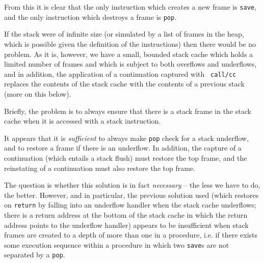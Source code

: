 From this it is clear that the only instruction which creates a new frame
is {\tt save}, and the only instruction which destroys a frame is {\tt pop}.

If the stack were of infinite size (or simulated by a list of frames
in the heap, which is possible given the definition of the
instructions) then there would be no problem. As it is, however, we
have a small, bounded stack cache which holds a limited number of
frames and which is subject to both overflows and underflows, and in
addition, the application of a continuation captured with {\tt
call/cc} replaces the contents of the stack cache with the contents of
a previous stack (more on this below).

Briefly, the problem is to always ensure that there is a stack frame in
the stack cache when it is accessed with a stack instruction. 

It appears that it is {\em sufficient} to always make {\tt pop} check for a
stack underflow, and to restore a frame if there is an underflow. In
addition, the capture of a continuation (which entails a stack flush)
must restore the top frame, and the reinstating of a continuation must
also restore the top frame. 

The question is whether this solution is in fact {\em necessary} --
the less we have to do, the better. However, and in particular, the
previous solution used (which restores on {\tt return} by falling into
an underflow handler when the stack cache underflows; there is a
return address at the bottom of the stack cache in which the return
address points to the underflow handler) appears to be insufficient
when stack frames are created to a depth of more than one in a
procedure, i.e. if there exists some execution sequence within a
procedure in which two {\tt save}s are not separated by a {\tt pop}.


